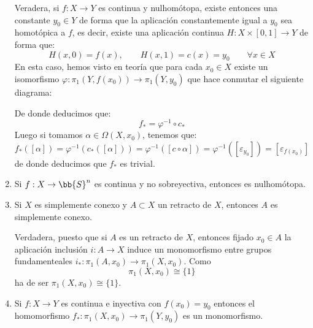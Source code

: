 \begin{ejercicio}
\begin{enumerate}[label=\alph*)]
            Veradera, si $f:X\to Y$ es continua y nulhomótopa, existe entonces una constante $y_0\in Y$ de forma que la aplicación constantemente igual a $y_0$
            sea homotópica a $f$, es decir, existe una aplicación continua $H:X\times [0,1]\to Y$ de forma que:
            \begin{equation*}
                H(x,0) = f(x), \qquad H(x,1) = c(x) = y_0 \qquad \forall x\in X
            \end{equation*}
            En esta caso, hemos visto en teoría que para cada $x_0\in X$ existe un isomorfismo $\varphi:\pi_1(Y,f(x_0))\to\pi_1(Y,y_0)$ que hace conmutar el siguiente diagrama:
            \begin{figure}[H]
                \centering
            \end{figure}
            \noindent
            De donde deducimos que:
            \begin{equation*}
                f_\ast = \varphi^{-1}\circ c_\ast
            \end{equation*}
            Luego si tomamos $\alpha\in \Omega(X,x_0)$, tenemos que:
            \begin{equation*}
                f_\ast([\alpha]) = \varphi^{-1}(c_\ast([\alpha])) = \varphi^{-1}([c \circ \alpha]) = \varphi^{-1}([\varepsilon_{y_0}]) = [\varepsilon_{f(x_0)}]
            \end{equation*}
            de donde deducimos que $f_\ast$ es trivial.
        \item Si $f:X\to \bb{S}^n$ es continua y no sobreyectiva, entonces es nulhomótopa.
        \item Si $X$ es simplemente conexo y $A\subset X$ un retracto de $X$, entonces $A$ es simplemente conexo.

            Verdadera, puesto que si $A$ es un retracto de $X$, entonces fijado $x_0\in A$ la aplicación inclusión $i:A\to X$ induce un monomorfismo entre grupos fundamenteales $i_\ast:\pi_1(A,x_0)\to \pi_1(X,x_0)$. Como
            \begin{equation*}
                \pi_1(X,x_0) \cong \{1\}
            \end{equation*}
            ha de ser $\pi_1(X,x_0)\cong \{1\}$.
        \item Si $f:X\to Y$ es continua e inyectiva con $f(x_0)=y_0$ entonces el homomorfismo $f_\ast:\pi_1(X,x_0)\to \pi_1(Y,y_0)$ es un monomorfismo.


\end{enumerate}
\end{ejercicio}
